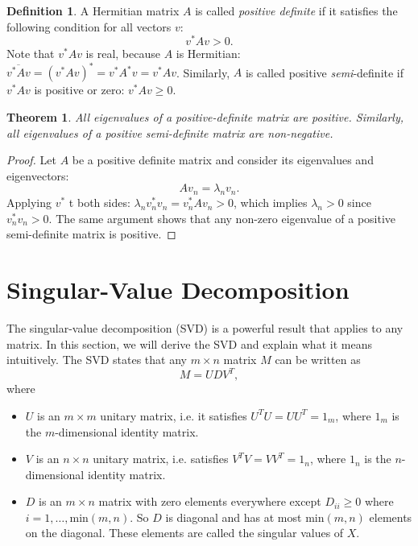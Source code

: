 \documentclass{article}
\newtheorem{theorem}{Theorem}[section]
\theoremstyle{definition}
\newtheorem{definition}{Definition}[section]
\begin{document}
\begin{definition}
\label{linalg-def:pos-def}
A Hermitian matrix $A$ is called \textit{positive definite} if it satisfies the following condition for all vectors $v$:
\begin{equation}
    v^*Av > 0.
\end{equation}
Note that $v^*Av$ is real, because $A$ is Hermitian: $\overline{v^*Av}=(v^*Av)^*=v^*A^*v=v^*Av$. Similarly, $A$ is called positive \textit{semi}-definite if $v^*Av$ is positive or zero: $v^*Av \ge 0$.
\end{definition}

\begin{theorem}
\label{linalg-def:pos-def-eig}
All eigenvalues of a positive-definite matrix are positive. Similarly, all eigenvalues of a positive semi-definite matrix are non-negative.
\end{theorem}

\begin{proof}
Let $A$ be a positive definite matrix and consider its eigenvalues and eigenvectors:
\begin{equation}
    Av_n=\lambda_nv_n.
\end{equation}
Applying $v^*$ t both sides: $\lambda_nv_n^*v_n=v_n^*Av_n > 0$, which implies $\lambda_n > 0$ since $v_n^*v_n>0$. The same argument shows that any non-zero eigenvalue of a positive semi-definite matrix is positive.
\end{proof}

\section{Singular-Value Decomposition}
The singular-value decomposition (SVD) is a powerful result that applies to any matrix. In this section, we will derive the SVD and explain what it means intuitively. The SVD states that any $m\times n$ matrix $M$ can be written as
\begin{equation}
    M=UDV^T,
\end{equation}
where
\begin{itemize}
    \item $U$ is an $m\times m$ unitary matrix, i.e. it satisfies $U^TU=UU^T=1_m$, where $1_m$ is the $m$-dimensional identity matrix.
    \item $V$ is an $n\times n$ unitary matrix, i.e. satisfies $V^TV=VV^T=1_n$, where $1_n$ is the $n$-dimensional identity matrix.
    \item $D$ is an $m\times n$ matrix with zero elements everywhere except $D_{ii}\ge0$ where $i=1,\dots,\text{min}(m, n)$. So $D$ is diagonal and has at most $\text{min}(m, n)$ elements on the diagonal. These elements are called the singular values of $X$.
\end{itemize}
\end{document}
